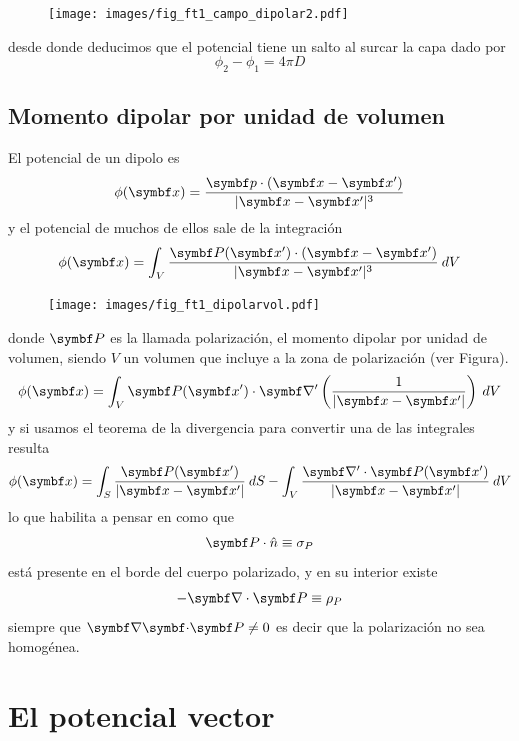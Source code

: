 \documentclass[10pt,oneside]{CBFT_book}
\begin{document}
\begin{figure}[htb]
	\begin{center}
	\texttt{[image: images/fig\_ft1\_campo\_dipolar2.pdf]}	 
	\end{center}
	\caption{}
\end{figure}

desde donde deducimos que el potencial tiene un salto al surcar la capa dado por 
\[
	\phi_2 - \phi_1 = 4\pi D
\]

\subsection{Momento dipolar por unidad de volumen}

El potencial de un dipolo es
\[
	\phi(\vb{x}) = \frac{ \vb{p}\cdot(\vb{x}-\vb{x}') }{|\vb{x} - \vb{x}'|^3} 
\]
y el potencial de muchos de ellos sale de la integración
\[
	\phi(\vb{x}) = \int_V \frac{ \vb{P}(\vb{x}')\cdot(\vb{x}-\vb{x}') }{|\vb{x} - \vb{x}'|^3}  \: dV
\]
\begin{figure}[htb]
	\begin{center}
	\texttt{[image: images/fig\_ft1\_dipolarvol.pdf]}	 
	\end{center}
	\caption{}
\end{figure}
donde $\vb{P}$ es la llamada polarización, el momento dipolar por unidad de volumen, siendo $V$ un volumen
que incluye a la zona de polarización (ver Figura).
\[
	\phi(\vb{x}) = \int_V \vb{P}(\vb{x}')\cdot \Nabla' \left(\frac{1}{|\vb{x} - \vb{x}'|} \right)\: dV
\]
y si usamos el teorema de la divergencia para convertir una de las integrales resulta
\[
	\phi(\vb{x}) = \int_S \frac{\vb{P}(\vb{x}')}{ |\vb{x} - \vb{x}'|} \: dS
	- \int_V  \frac{  \Nabla' \cdot \vb{P}(\vb{x}') }{|\vb{x} - \vb{x}'|} \: dV 
\]
lo que habilita a pensar en como que 
\[
	\vb{P}\cdot\hat{n} \equiv \sigma_P
\]
está presente en el borde del cuerpo polarizado, y en su interior existe
\[
	- \Nabla\cdot\vb{P} \equiv \rho_P
\]
siempre que $\divem{P}\neq 0$ es decir que la polarización no sea homogénea.

\section{El potencial vector}
\end{document}
